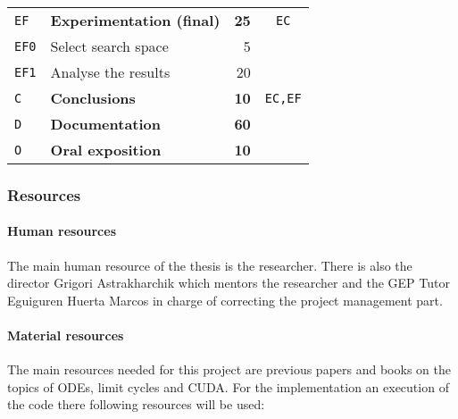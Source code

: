 \begin{table}[H]
\begin{tabular}{llrc}
    \addlinespace[0.5em]
    \texttt{EF} & \textbf{Experimentation (final)} & \textbf{25} & \texttt{EC} \\
        \texttt{EF0} & Select search space & 5 & \\
        \texttt{EF1} & Analyse the results & 20 & \\

    \addlinespace[0.5em]
        \texttt{C} & \textbf{Conclusions} & \textbf{10} & \texttt{EC,EF} \\
        \texttt{D} & \textbf{Documentation} & \textbf{60} & \\
        \texttt{O} & \textbf{Oral exposition} & \textbf{10} & \\
        \bottomrule
    \end{tabular}
\end{table}

\pagebreak
\subsubsection{Resources}

\paragraph{Human resources}

The main human resource of the thesis is the researcher.  There is also the
director Grigori Astrakharchik which mentors the researcher and the GEP Tutor
Eguiguren Huerta Marcos in charge of correcting the project management part.

\paragraph{Material resources}

The main resources needed for this project are previous papers and books on the
topics of ODEs, limit cycles and CUDA. For the implementation an execution of
the code there following resources will be used:


